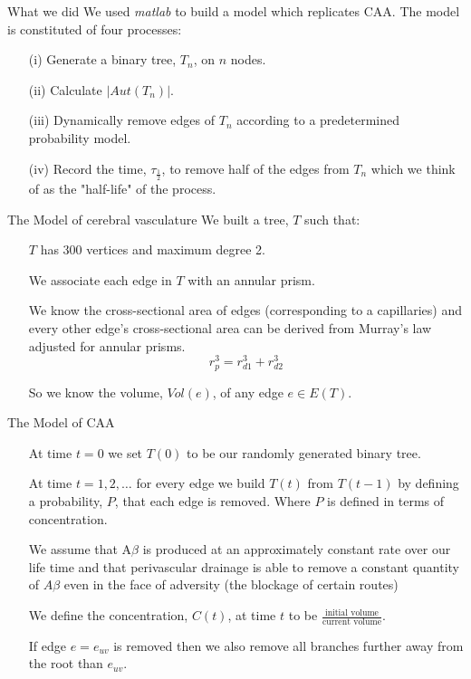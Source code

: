\documentclass{beamer}
\begin{document}
\begin{frame}{What we did}
We used  \emph{matlab} to build a model which replicates CAA.  The model is constituted of four processes:
\begin{itemize}
\item[(i)]Generate a binary tree, $T_{n}$, on $n$ nodes.
\item[(ii)]Calculate $|Aut(T_{n})|$.
\item[(iii)]Dynamically remove edges of $T_{n}$ according to a predetermined probability model.
\item[(iv)]Record the time, $\tau_{\frac{1}{2}}$, to remove half of the edges from $T_{n}$ which we think of as the "half-life" of the process.
\end{itemize} 

\end{frame}

\begin{frame}{The Model of cerebral vasculature}
We built a tree, $T$ such that:
\begin{itemize}
 \item[] $T$ has 300 vertices and maximum degree 2.
 \item[] We associate each edge in $T$ with an annular prism.
 \item[]We know the cross-sectional area of edges (corresponding to a capillaries) and every other edge's cross-sectional area can be derived from    Murray's law adjusted for annular prisms.
 \[r_{p}^{3} = r_{d1}^{3} + r_{d2}^{3}\]
  \item[]So we know the volume, $Vol(e)$, of any edge $e \in E(T)$.
 \end{itemize}


\end{frame}

\begin{frame}{The Model of CAA}
\begin{itemize}
 \item[]At time $t=0$ we set $T(0)$ to be our randomly generated binary tree.

 \item[]At time  $t = 1,2,\dots$ for every edge we build $T(t)$ from $T(t-1)$ by defining a probability, $P$, that each edge is removed. Where $P$ is defined in terms of concentration.
 \item[]We assume that A$\beta$ is produced at an approximately constant rate over our life time and that perivascular drainage is able to remove a constant quantity of $A\beta$ even in the face of adversity (the blockage of certain routes)
 \item[]We define the concentration, $C(t)$, at time $t$ to be $\frac{\text{initial volume}}{\text{current volume}}$.   
 \item[]If edge $e = e_{uv}$ is removed then we also remove all branches further away from  the root than $e_{uv}$.  
 \end{itemize}
\end{frame}
\end{document}
